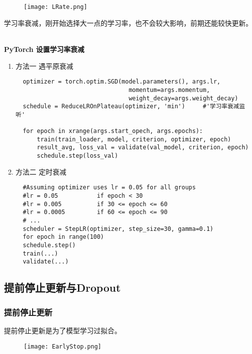 ~\\
~\\
\begin{figure}[!h]
  \centering
  \texttt{[image: LRate.png]}
\end{figure}
 学习率衰减，刚开始选择大一点的学习率，也不会较大影响，前期还能较快更新。

 ~\\
 \textbf{PyTorch 设置学习率衰减}
 \begin{enumerate}
   \item 方法一     遇平原衰减
   \begin{lstlisting}
  optimizer = torch.optim.SGD(model.parameters(), args.lr,
                                momentum=args.momentum,
                                weight_decay=args.weight_decay)
  schedule = ReduceLROnPlateau(optimizer, 'min')     #'学习率衰减监听'

  for epoch in xrange(args.start_opech, args.epochs):
      train(train_loader, model, criterion, optimizer, epoch)
      result_avg, loss_val = validate(val_model, criterion, epoch)
      schedule.step(loss_val)
\end{lstlisting}
   \item 方法二     定时衰减
\begin{lstlisting}
  #Assuming optimizer uses lr = 0.05 for all groups
  #lr = 0.05           if epoch < 30
  #lr = 0.005          if 30 <= epoch <= 60
  #lr = 0.0005         if 60 <= epoch <= 90
  # ...
  scheduler = StepLR(optimizer, step_size=30, gamma=0.1)
  for epoch in range(100)
  schedule.step()
  train(...)
  validate(...)
\end{lstlisting}
 \end{enumerate}


\subsection{提前停止更新与Dropout}
\subsubsection{提前停止更新}
提前停止更新是为了模型学习过拟合。

\begin{figure}[!h]
  \centering
  \texttt{[image: EarlyStop.png]}
\end{figure}

